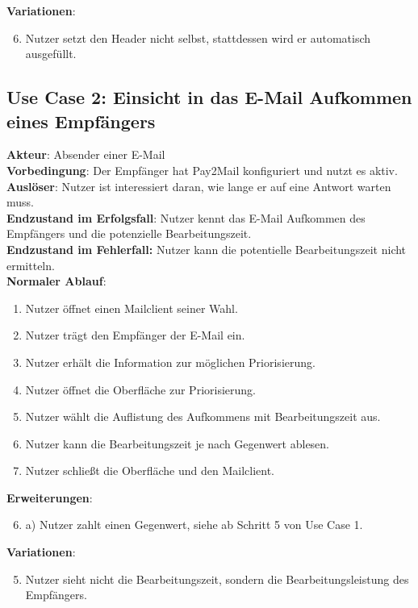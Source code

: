\noindent \textbf{Variationen}:
\begin{enumerate}
\setcounter{enumi}{5}
    \item \textquotesingle{} Nutzer setzt den Header nicht selbst, stattdessen wird er automatisch ausgefüllt.
\end{enumerate}


\subsection*{Use Case 2: Einsicht in das E-Mail Aufkommen eines Empfängers}
\textbf{Akteur}: Absender einer E-Mail \\
\textbf{Vorbedingung}: Der Empfänger hat Pay2Mail konfiguriert und nutzt es aktiv. \\
\textbf{Auslöser}: Nutzer ist interessiert daran, wie lange er auf eine Antwort warten muss. \\
\textbf{Endzustand im Erfolgsfall}: Nutzer kennt das E-Mail Aufkommen des Empfängers und die potenzielle Bearbeitungszeit. \\
\textbf{Endzustand im Fehlerfall:} Nutzer kann die potentielle Bearbeitungszeit nicht ermitteln. \\

\noindent \textbf{Normaler Ablauf}:
\begin{enumerate}
    \item Nutzer öffnet einen Mailclient seiner Wahl.
    \item Nutzer trägt den Empfänger der E-Mail ein.
    \item Nutzer erhält die Information zur möglichen Priorisierung.
    \item Nutzer öffnet die Oberfläche zur Priorisierung.
    \item Nutzer wählt die Auflistung des Aufkommens mit Bearbeitungszeit aus.
    \item Nutzer kann die Bearbeitungszeit je nach Gegenwert ablesen.
    \item Nutzer schließt die Oberfläche und den Mailclient.
\end{enumerate}

\noindent \textbf{Erweiterungen}:
\begin{enumerate}
\setcounter{enumi}{5}
    \item a) Nutzer zahlt einen Gegenwert, siehe ab Schritt 5 von Use Case 1.
\end{enumerate}

\noindent \textbf{Variationen}:
\begin{enumerate}
\setcounter{enumi}{4}
    \item \textquotesingle{} Nutzer sieht nicht die Bearbeitungszeit, sondern die Bearbeitungsleistung des Empfängers.
\end{enumerate}


